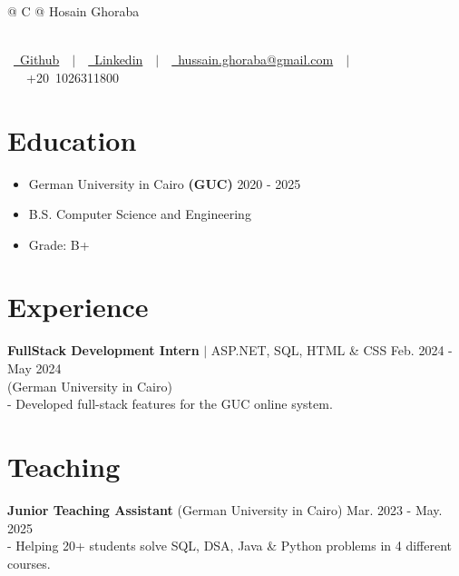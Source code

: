 \documentclass[a4paper,11pt]{article}
\begin{document}
\pagestyle{empty}

\begin{tabularx}{\linewidth}{@{} C @{}}
    \Huge{Hosain Ghoraba}                                         \\ [5pt] %
    {\hspace{-1cm} \par} \\
    \mbox {
    \href{https://github.com/hosain-ghoraba}{\raisebox{-0.05\height}\faGithub\ Github} \ $|$ \
    \href{https://www.linkedin.com/in/hussain-ghoraba-a35752264/}{\raisebox{-0.05\height}\faLinkedin\ Linkedin} \ $|$ \
    \href{mailto:hussain.ghoraba@gmail.com}{\raisebox{-0.05\height}\faEnvelope \ hussain.ghoraba@gmail.com} \ $|$ \
    {\raisebox{-0.05\height}\faMobile \ +20 1026311800}
    }
\end{tabularx}

\section{\textbf{Education}}
\begin{itemize}[noitemsep] %
    \item
          {German University in Cairo} \textbf{(GUC)} \hfill {2020 - 2025}
    \item B.S. Computer Science and Engineering
    \item Grade: B+
\end{itemize}

\section{\textbf{Experience}}
    \textbf{FullStack Development Intern} $|$ {ASP.NET, SQL, HTML \& CSS}  \hfill {Feb. 2024 - May 2024} \\
(German University in Cairo) \\
- Developed full-stack features for the GUC online system.


\section{\textbf{Teaching}}
\textbf{Junior Teaching Assistant } (German University in Cairo)  \hfill {Mar. 2023 - May. 2025} \\
- Helping 20+ students solve SQL, DSA, Java \& Python problems in 4 different courses.
\end{document}
